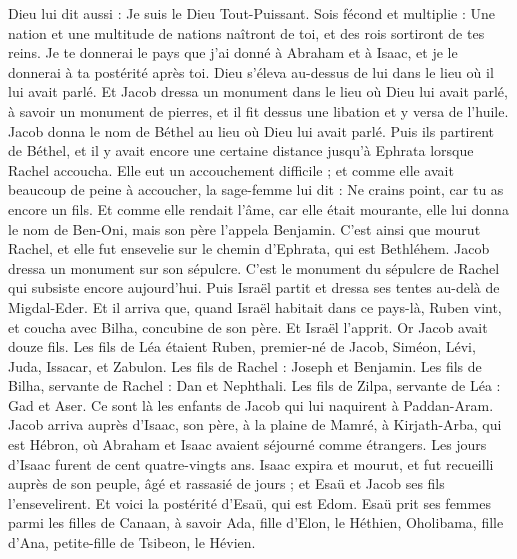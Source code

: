 \begin{multicols}{2}
Dieu lui dit aussi : Je suis le Dieu Tout-Puissant. Sois fécond et multiplie : Une nation et une multitude de nations naîtront de toi, et des rois sortiront de tes reins.
Je te donnerai le pays que j'ai donné à Abraham et à Isaac, et je le donnerai à ta postérité après toi.
Dieu s'éleva au-dessus de lui dans le lieu où il lui avait parlé.
Et Jacob dressa un monument dans le lieu où Dieu lui avait parlé, à savoir un monument de pierres, et il fit dessus une libation et y versa de l'huile.
Jacob donna le nom de Béthel au lieu où Dieu lui avait parlé.
Puis ils partirent de Béthel, et il y avait encore une certaine distance jusqu'à Ephrata lorsque Rachel accoucha. Elle eut un accouchement difficile ;
et comme elle avait beaucoup de peine à accoucher, la sage-femme lui dit : Ne crains point, car tu as encore un fils.
Et comme elle rendait l'âme, car elle était mourante, elle lui donna le nom de Ben-Oni, mais son père l'appela Benjamin.
C'est ainsi que mourut Rachel, et elle fut ensevelie sur le chemin d'Ephrata, qui est Bethléhem.
Jacob dressa un monument sur son sépulcre. C'est le monument du sépulcre de Rachel qui subsiste encore aujourd'hui.
Puis Israël partit et dressa ses tentes au-delà de Migdal-Eder.
Et il arriva que, quand Israël habitait dans ce pays-là, Ruben vint, et coucha avec Bilha, concubine de son père. Et Israël l'apprit. Or Jacob avait douze fils.
Les fils de Léa étaient Ruben, premier-né de Jacob, Siméon, Lévi, Juda, Issacar, et Zabulon.
Les fils de Rachel : Joseph et Benjamin.
Les fils de Bilha, servante de Rachel : Dan et Nephthali.
Les fils de Zilpa, servante de Léa : Gad et Aser. Ce sont là les enfants de Jacob qui lui naquirent à Paddan-Aram.
Jacob arriva auprès d'Isaac, son père, à la plaine de Mamré, à Kirjath-Arba, qui est Hébron, où Abraham et Isaac avaient séjourné comme étrangers.
Les jours d'Isaac furent de cent quatre-vingts ans.
Isaac expira et mourut, et fut recueilli auprès de son peuple, âgé et rassasié de jours ; et Esaü et Jacob ses fils l'ensevelirent.
\VerseOne{}Et voici la postérité d'Esaü, qui est Edom.
Esaü prit ses femmes parmi les filles de Canaan, à savoir Ada, fille d'Elon, le Héthien, Oholibama, fille d'Ana, petite-fille de Tsibeon, le Hévien.

\end{multicols}
